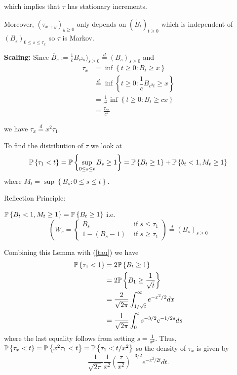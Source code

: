\documentclass[../../../Master/AppliedStochastics.tex]{subfiles}
\begin{document}
which implies that $\tau$ has stationary increments.

Moreover, 
$(\tau_{x + y})_{y \geq 0}$
only depends on $(\tilde{B}_t)_{t \geq 0 }$
which is independent of $(B_s)_{0 \leq s \leq \tau_x}$
so $\tau$ is Markov.

\textbf{Scaling:}
Since $\overline{B}_s := \frac{1}{c} B_{c^2s})_{s \geq 0} 
\stackrel{d}{=}(B_s)_{s \geq 0}$
and 
$$
\begin{aligned}
\tau_x 
& = \inf \left\lbrace t \geq 0 : B_t \geq x \right\rbrace \\
& \stackrel{d}{=} \inf \left\lbrace t \geq 0 : \dfrac{1}{c} B_{c^2t} \geq x 
\right\rbrace  \\
& = \frac{1}{c^2} \inf \left\lbrace t \geq 0 : B_t \geq c x \right\rbrace \\
& = \frac{\tau_{c x}}{c^2}
\end{aligned}
$$

we have 
$\tau_x \stackrel{d}{=} x^2\tau_1.$

To find the distribution of $\tau$ we look at
\begin{equation}
\P \left\lbrace \tau_1 < t \right\rbrace 
= \P \left\lbrace \sup_{0 \leq s \leq t} B_s \geq 1 \right\rbrace
= \P \left\lbrace B_t \geq 1 \right\rbrace + \P \left\lbrace b_t < 1, M_t \geq 
1 \right\rbrace \label{tau}
\end{equation}
where 
$M_t 
= \sup \left\lbrace B_s : 0 \leq s \leq t \right\rbrace.$

\begin{lemma}Reflection Principle:
	
	$\P \left\lbrace B_t < 1, M_t \geq 1 \right\rbrace 
	= \P \left\lbrace B_t \geq 1 \right\rbrace$
	i.e. 
	$$
	\left( W_s = \left\lbrace\begin{array}{cc}
	B_s 		& \text{ if } s \leq \tau_1 \\
	1-(B_s-1) 	& \text{ if } s \geq \tau_1
	\end{array}
	\right.
	\right)
	\stackrel{d}{=} (B_s)_{ s \geq 0 }
	$$
\end{lemma}

Combining this Lemma with (\ref{tau}) we have
$$
\begin{aligned}
\P \left\lbrace \tau_1 < 1 \right\rbrace 
& = 2 \P \left\lbrace B_t \geq 1 \right\rbrace 					\\
& = 2 \P \left\lbrace B_1 \geq \frac{1}{\sqrt{t}} \right\rbrace	\\
& = \frac{2}{\sqrt{2\pi}}\int_{1/\sqrt{t}}^{\infty} e^{-x^2/2} dx 	\\
& = \frac{1}{\sqrt{2 \pi}} \int_{0}^{t} s^{-3/2} e^{-1/2s} ds
\end{aligned}
$$
where the last equality follows from setting $s=\frac{1}{x^2}.$
Thus,
$\P \left\lbrace \tau_x < t \right\rbrace 
= \P \left\lbrace x^2\tau_1 < t \right\rbrace 
= \P \left\lbrace \tau_1 < t/x^2 \right\rbrace 
$
so the density of $\tau_x$ is given by
$$
\frac{1}{\sqrt{2 \pi}}\frac{1}{x^2} \left(\frac{\tau}{x^2}\right)^{-3/2} 
e^{-x^2/2t} dt.
$$
\end{document}

